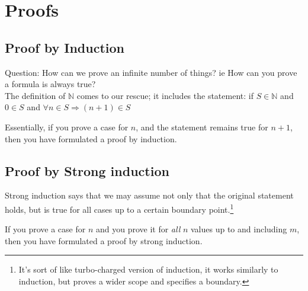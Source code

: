 \chapter{Proofs}
\label{chap:Proofs}

\section{Proof by Induction}
Question: How can we prove an infinite number of things? ie How can you prove
a formula is always true? \\
The definition of $\mathbb{N}$ comes to our rescue; it includes the statement:
if $S \in \mathbb{N}$ and $0 \in S$ and $\forall n \in S \Rightarrow (n + 1) \in S $

Essentially, if you prove a case for $n$, and the statement remains true
for $n+1$, then you have formulated a proof by induction.

\section{Proof by Strong induction}
\label{sec:StrongInduction}
Strong induction says that we may assume not only that the original statement
holds, but is true for all cases up to a certain boundary point.\footnote{It's
sort of like turbo-charged version of induction, it works similarly to
induction, but proves a wider scope and specifies a boundary.}

If you prove a case for $n$ and you prove it for \emph{all} $n$ values up to and
including $m$, then you have formulated a proof by strong induction.

